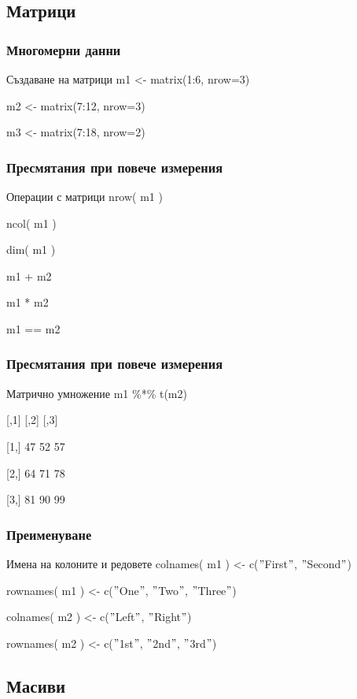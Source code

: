 \documentclass{beamer}
\begin{document}
\subsection{Матрици}

\begin{frame}
\frametitle{Многомерни данни}
\begin{block}{Създаване на матрици}
m1 <- matrix(1:6, nrow=3)

m2 <- matrix(7:12, nrow=3)

m3 <- matrix(7:18, nrow=2)
\end{block}
\end{frame}

\begin{frame}
\frametitle{Пресмятания при повече измерения}
\begin{block}{Операции с матрици}
nrow( m1 )

ncol( m1 )

dim( m1 )

m1 + m2
 
m1 * m2

m1 == m2
\end{block}
\end{frame}

\begin{frame}
\frametitle{Пресмятания при повече измерения}
\begin{block}{Матрично умножение}
m1 \%*\% t(m2)

     [,1] [,2] [,3]

[1,]   47   52   57

[2,]   64   71   78

[3,]   81   90   99
\end{block}
\end{frame}

\begin{frame}
\frametitle{Преименуване}
\begin{block}{Имена на колоните и редовете}
colnames( m1 ) <- c($"$First$"$, $"$Second$"$)

rownames( m1 ) <- c($"$One$"$, $"$Two$"$, $"$Three$"$)

colnames( m2 ) <- c($"$Left$"$, $"$Right$"$)

rownames( m2 ) <- c($"$1st$"$, $"$2nd$"$, $"$3rd$"$)
\end{block}
\end{frame}

\subsection{Масиви}
\end{document}
